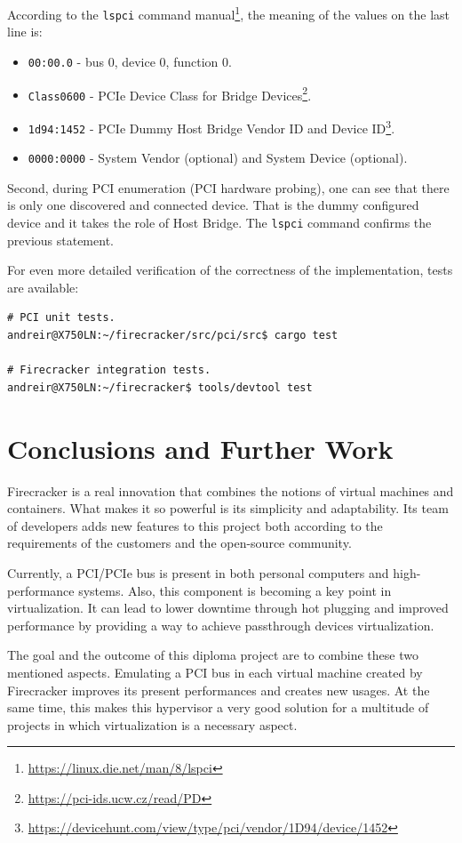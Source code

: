 \documentclass[12pt, a4paper]{report}
\begin{document}
According to the \texttt{lspci} command manual\footnote{\url{https://linux.die.net/man/8/lspci}}, the meaning of the values on the last line is:
\begin{itemize}
    \item \texttt{00:00.0} - bus 0, device 0, function 0.
    \item \texttt{Class0600} - PCIe Device Class for Bridge Devices\footnote{\url{https://pci-ids.ucw.cz/read/PD}}.
    \item \texttt{1d94:1452} - PCIe Dummy Host Bridge Vendor ID and Device ID\footnote{\url{https://devicehunt.com/view/type/pci/vendor/1D94/device/1452}}.
    \item \texttt{0000:0000} - System Vendor (optional) and System Device (optional).
\end{itemize}

Second, during PCI enumeration (PCI hardware probing), one can see that there is only one discovered and connected device. That is the dummy configured device and it takes the role of Host Bridge. The \texttt{lspci} command confirms the previous statement.

For even more detailed verification of the correctness of the implementation, tests are available:
\begin{lstlisting}[caption={Testing}]
# PCI unit tests.
andreir@X750LN:~/firecracker/src/pci/src$ cargo test

# Firecracker integration tests.
andreir@X750LN:~/firecracker$ tools/devtool test
\end{lstlisting}


\chapter{Conclusions and Further Work}\label{Conclusions and Further Work}

Firecracker is a real innovation that combines the notions of virtual machines and containers. What makes it so powerful is its simplicity and adaptability. Its team of developers adds new features to this project both according to the requirements of the customers and the open-source community.

Currently, a PCI/PCIe bus is present in both personal computers and high-performance systems. Also, this component is becoming a key point in virtualization. It can lead to lower downtime through hot plugging and improved performance by providing a way to achieve passthrough devices virtualization.

The goal and the outcome of this diploma project are to combine these two mentioned aspects. Emulating a PCI bus in each virtual machine created by Firecracker improves its present performances and creates new usages. At the same time, this makes this hypervisor a very good solution for a multitude of projects in which virtualization is a necessary aspect.
\end{document}
